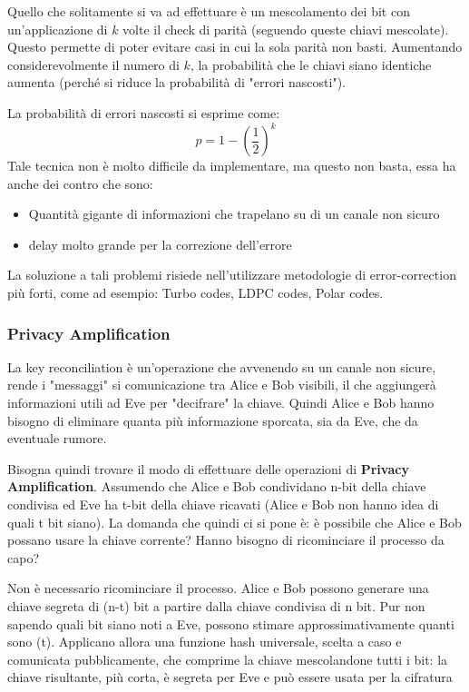 Quello che solitamente si va ad effettuare è un mescolamento dei bit con un'applicazione di \(k\) volte il check di parità (seguendo queste chiavi mescolate). Questo permette di poter evitare casi in cui la sola parità non basti. Aumentando considerevolmente il numero di \(k\), la probabilità che le chiavi siano identiche aumenta (perché si riduce la probabilità di "errori nascosti").

La probabilità di errori nascosti si esprime come:
\[
p = 1 - \left(\frac{1}{2}\right)^k
\]
Tale tecnica non è molto difficile da implementare, ma questo non basta, essa ha anche dei contro che sono:
\begin{itemize}
    \item Quantità gigante di informazioni che trapelano su di un canale non sicuro
    \item delay molto grande per la correzione dell'errore
\end{itemize}

La soluzione a tali problemi risiede nell'utilizzare metodologie di error-correction più forti, come ad esempio: Turbo codes, LDPC codes, Polar codes.

\subsubsection{Privacy Amplification}
La key reconciliation è un'operazione che avvenendo su un canale non sicure, rende i "messaggi" si comunicazione tra Alice e Bob visibili, il che aggiungerà informazioni utili ad Eve per "decifrare" la chiave. Quindi Alice e Bob hanno bisogno di eliminare quanta più informazione sporcata, sia da Eve, che da eventuale rumore.

Bisogna quindi trovare il modo di effettuare delle operazioni di \textbf{Privacy Amplification}.
Assumendo che Alice e Bob condividano n-bit della chiave condivisa ed Eve ha t-bit della chiave ricavati (Alice e Bob non hanno idea di quali t bit siano). La domanda che quindi ci si pone è: è possibile che Alice e Bob possano usare la chiave corrente? Hanno bisogno di ricominciare il processo da capo?

Non è necessario ricominciare il processo. Alice e Bob possono generare una chiave segreta di (n-t) bit a partire dalla chiave condivisa di n bit. Pur non sapendo quali bit siano noti a Eve, possono stimare approssimativamente quanti sono (t). Applicano allora una funzione hash universale, scelta a caso e comunicata pubblicamente, che comprime la chiave mescolandone tutti i bit: la chiave risultante, più corta, è segreta per Eve e può essere usata per la cifratura